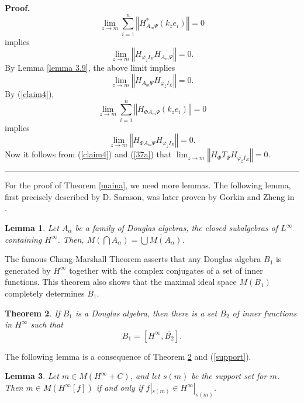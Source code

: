 \documentclass{article}%
\newtheorem{theorem}{Theorem}[section]
\newtheorem{lemma}[theorem]{Lemma}
\newenvironment{proof}[1][Proof]{\noindent\textbf{#1.} }{\ \rule{0.5em}{0.5em}}
\begin{document}
\begin{proof}
\[
\lim_{z\rightarrow m}\sum_{i=1}^{n}\left\Vert H_{A_{m}\Psi}^{\ast}\left(
k_{\overline{z}}e_{i}\right)  \right\Vert =0
\]
implies
\[
\lim_{z\rightarrow m}\left\Vert H_{\overline{\varphi_{\overline{z}}}I_{E}%
}H_{A_{m}\Psi}\right\Vert =0.
\]
By Lemma \ref{lemma 3.9}, the above limit implies
\[
\lim_{z\rightarrow m}\left\Vert H_{A_{m}\Psi}H_{\overline{\varphi
_{\overline{z}}}I_{E}}\right\Vert =0.
\]
By (\ref{claim4}),
\[
\lim_{z\rightarrow m}\sum_{i=1}^{n}\left\Vert H_{\Phi A_{m}\Psi}\left(
k_{z}e_{i}\right)  \right\Vert =0
\]
implies
\[
\lim_{z\rightarrow m}\left\Vert H_{\Phi A_{m}\Psi}H_{\overline{\varphi
_{\overline{z}}}I_{E}}\right\Vert =0.
\]
Now it follows from (\ref{claim4}) and (\ref{37a}) that $\lim_{z\rightarrow
m}\left\Vert H_{\Phi}T_{\Psi}H_{\overline{\varphi_{\overline{z}}}I_{E}%
}\right\Vert =0.$
\end{proof}

For the proof of Theorem \ref{maina}, we need more lemmas. The following
lemma, first precisely described by D. Sarason, was later proven by Gorkin and
Zheng in \cite{Gorkin}.

\begin{lemma}
\cite[Lemma 1.3]{Gorkin}\label{1999Gorkin lemma1.3} Let $A_{\alpha}$ be a
family of Douglas algebras, the closed subalgebras of $L^{\infty}$ containing
$H^{\infty}$. Then, $M\left(  \bigcap A_{\alpha}\right)  =\overline{\bigcup
M\left(  A_{\alpha}\right)  }$.
\end{lemma}

The famous Chang-Marshall Theorem \cite{Chang, Marshall} asserts that any
Douglas algebra $B_{1}$ is generated by $H^{\infty}$ together with the complex
conjugates of a set of inner functions. This theorem also shows that the
maximal ideal space $M(B_{1})$ completely determines $B_{1}$.

\begin{theorem}
\label{Chang-Marshall} If $B_{1}$ is a Douglas algebra, then there is a set
$B_{2}$ of inner functions in $H^{\infty}$ such that
\[
B_{1}=[H^{\infty},\overline{B_{2}} ].
\]

\end{theorem}

The following lemma is a consequence of Theorem \ref{Chang-Marshall} and
(\ref{support}).

\begin{lemma}
\cite[Lemma 1.5]{Gorkin}\label{1999Gorkin lemma1.5} Let $m\in M\left(
H^{\infty}+C\right)  $, and let $s(m)$ be the support set for $m$. Then $m\in
M\left(  H^{\infty}[f]\right)  $ if and only if $f|_{s(m)}\in H^{\infty
}|_{s(m)}$.
\end{lemma}
\end{document}
